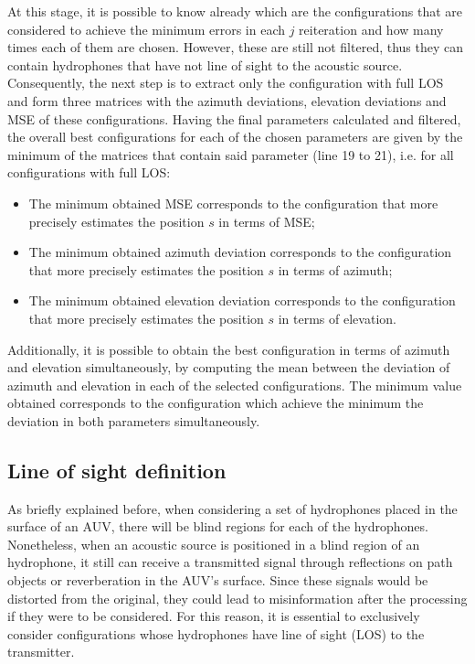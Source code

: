 At this stage, it is possible to know already which are the configurations that are considered to achieve the minimum errors in each $j$ reiteration and how many times each of them are chosen. However, these are still not filtered, thus they can contain hydrophones that have not line of sight to the acoustic source. Consequently, the next step is to extract only the configuration with full LOS and form three matrices with the azimuth deviations, elevation deviations and MSE of these configurations. Having the final parameters calculated and filtered, the overall best configurations for each of the chosen parameters are given by the minimum of the matrices that contain said parameter (line 19 to 21), i.e. for all configurations with full LOS:

\begin{itemize}
	
	\item  The minimum obtained MSE corresponds to the configuration that more precisely estimates the position $s$ in terms of MSE;
	
	\item The minimum obtained azimuth deviation corresponds to the configuration that more precisely estimates the position $s$ in terms of azimuth;
	
	\item The minimum obtained elevation deviation corresponds to the configuration that more precisely estimates the position $s$ in terms of elevation.
	
\end{itemize}

Additionally, it is possible to obtain the best configuration in terms of azimuth and elevation simultaneously, by computing the mean between the deviation of azimuth and elevation in each of the selected configurations. The minimum value obtained corresponds to the configuration which achieve the minimum the deviation in both parameters simultaneously.

\subsection{Line of sight definition} \label{subsec:lineofsight}

As briefly explained before, when considering a set of hydrophones placed in the surface of an AUV, there will be blind regions for each of the hydrophones. Nonetheless, when an acoustic source is positioned in a blind region of an hydrophone, it still can receive a transmitted signal through reflections on path objects or reverberation in the AUV's surface. Since these signals would be distorted from the original, they could lead to misinformation after the processing if they were to be considered. For this reason, it is essential to exclusively consider configurations whose hydrophones have line of sight (LOS) to the transmitter. 

